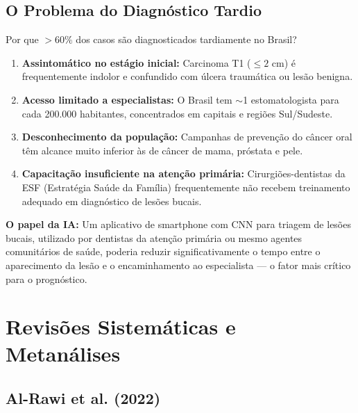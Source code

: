 \subsection{O Problema do Diagnóstico Tardio}

Por que $> 60\%$ dos casos são diagnosticados tardiamente no Brasil?

\begin{enumerate}
  \item \textbf{Assintomático no estágio inicial:} Carcinoma T1 ($\leq 2$ cm) é
        frequentemente indolor e confundido com úlcera traumática ou lesão benigna.
  \item \textbf{Acesso limitado a especialistas:} O Brasil tem $\sim$1 estomatologista
        para cada 200.000 habitantes, concentrados em capitais e regiões Sul/Sudeste.
  \item \textbf{Desconhecimento da população:} Campanhas de prevenção do câncer oral
        têm alcance muito inferior às de câncer de mama, próstata e pele.
  \item \textbf{Capacitação insuficiente na atenção primária:} Cirurgiões-dentistas
        da ESF (Estratégia Saúde da Família) frequentemente não recebem treinamento
        adequado em diagnóstico de lesões bucais.
\end{enumerate}

\textbf{O papel da IA:} Um aplicativo de smartphone com CNN para triagem de lesões
bucais, utilizado por dentistas da atenção primária ou mesmo agentes comunitários
de saúde, poderia reduzir significativamente o tempo entre o aparecimento da lesão
e o encaminhamento ao especialista --- o fator mais crítico para o prognóstico.


\section{Revisões Sistemáticas e Metanálises}
\label{sec:revisoes-cancer}

\subsection{Al-Rawi et al. (2022)}

